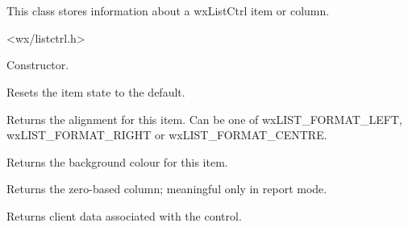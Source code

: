 \section{}\label{wxlistitem}

This class stores information about a wxListCtrl item or column.




<wx/listctrl.h>


\label{wxlistitemwxlistitem}


Constructor.

\label{wxlistitemclear}


Resets the item state to the default.



\label{wxlistitemgetalign}


Returns the alignment for this item. Can be one of
wxLIST\_FORMAT\_LEFT, wxLIST\_FORMAT\_RIGHT or wxLIST\_FORMAT\_CENTRE.



\label{wxlistitemgetbackgroundcolour}


Returns the background colour for this item.



\label{wxlistitemgetcolumn}


Returns the zero-based column; meaningful only in report mode.



\label{wxlistitemgetdata}


Returns client data associated with the control.



\label{wxlistitemgetfont}

